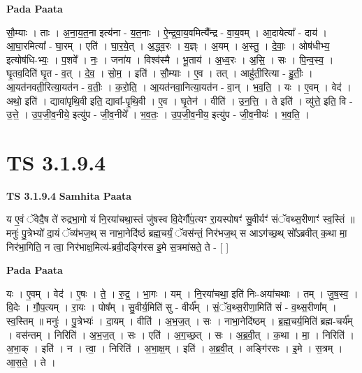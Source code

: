 \documentclass[17pt]{extarticle}
\begin{document}
\textbf{Pada Paata} \newline

सौ॒म्याः । ताः । अ॒ना॒य॒त॒ना इत्य॑ना - य॒त॒नाः । ऐ॒न्द्र॒वा॒य॒वमित्यै᳚न्द्र - वा॒य॒वम् । आ॒दायेत्या᳚ - दाय॑ । आ॒घा॒रमित्या᳚ - घा॒रम् । एति॑ । घा॒र॒ये॒त् । अ॒द्ध्व॒रः । य॒ज्ञ्ः । अ॒यम् । अ॒स्तु॒ । दे॒वाः॒ । ओष॑धीभ्य॒ इत्योष॑धि-भ्यः॒ । प॒शवे᳚ । नः॒ । जना॑य । विश्व॑स्मै । भू॒ताय॑ । अ॒ध्व॒रः । अ॒सि॒ । सः । पि॒न्व॒स्व॒ । घृ॒तव॒दिति॑ घृ॒त - व॒त् । दे॒व॒ । सो॒म॒ । इति॑ । सौ॒म्याः । ए॒व । तत् । आहु॑ती॒रित्या - हु॒तीः॒ । आ॒यत॑नवती॒रित्या॒यत॑न - व॒तीः॒ । क॒रो॒ति॒ । आ॒यत॑नवा॒नित्या॒यत॑न - वा॒न् । भ॒व॒ति॒ । यः । ए॒वम् । वेद॑ । अथो॒ इति॑ । द्यावा॑पृथि॒वी इति॒ द्यावा᳚-पृ॒थि॒वी । ए॒व । घृ॒तेन॑ । वीति॑ । उ॒न॒त्ति॒ । ते इति॑ । व्यु॑त्ते॒ इति॒ वि - उ॒त्ते॒ । उ॒प॒जी॒व॒नीये॒ इत्यु॑प - जी॒व॒नीये᳚ । भ॒व॒तः॒ । उ॒प॒जी॒व॒नीय॒ इत्यु॑प - जी॒व॒नीयः॑ । भ॒व॒ति॒ ।  \newline




\section*{ TS 3.1.9.4 }

\textbf{TS 3.1.9.4 } \newline
\textbf{Samhita Paata} \newline

य ए॒वं ॅवेदै॒ष ते॑ रुद्रभा॒गो यं नि॒रया॑चथा॒स्तं जु॑षस्व वि॒देर्गौ॑प॒त्यꣳ रा॒यस्पोषꣳ॑ सु॒वीर्यꣳ॑ संॅवथ्स॒रीणाꣳ॑ स्व॒स्तिं ॥ मनुः॑ पु॒त्रेभ्यो॑ दा॒यं ॅव्य॑भज॒थ् स नाभा॒नेदि॑ष्ठं ब्रह्म॒चर्यं॒ ॅवस॑न्तं॒ निर॑भज॒थ् स आऽग॑च्छ॒थ् सो᳚ऽब्रवीत् क॒था मा॒ निर॑भा॒गिति॒ न त्वा॒ निर॑भाक्ष॒मित्य॑-ब्रवी॒दङ्गि॑रस इ॒मे स॒त्रमा॑सते॒ ते - [  ] \newline

\textbf{Pada Paata} \newline

यः । ए॒वम् । वेद॑ । ए॒षः । ते॒ । रु॒द्र॒ । भा॒गः । यम् । नि॒रया॑चथा॒ इति॑ निः-अया॑चथाः । तम् । जु॒ष॒स्व॒ । वि॒देः । गौ॒प॒त्यम् । रा॒यः । पोष᳚म् । सु॒वीर्य॒मिति॑ सु - वीर्य᳚म् । सं॒ॅव॒थ्स॒रीणा॒मिति॑ सं - व॒थ्स॒रीणा᳚म् । स्व॒स्तिम् ॥ मनुः॑ । पु॒त्रेभ्यः॑ । दा॒यम् । वीति॑ । अ॒भ॒ज॒त् । सः । नाभा॒नेदि॑ष्ठम् । ब्र॒ह्म॒चर्य॒मिति॑ ब्रह्म-चर्य᳚म् । वस॑न्तम् । निरिति॑ । अ॒भ॒ज॒त् । सः । एति॑ । अ॒ग॒च्छ॒त् । सः । अ॒ब्र॒वी॒त् । क॒था । मा॒ । निरिति॑ । अ॒भा॒क् । इति॑ । न । त्वा॒ । निरिति॑ । अ॒भा॒क्ष॒म् । इति॑ । अ॒ब्र॒वी॒त् । अङ्गि॑रसः । इ॒मे । स॒त्रम् । आ॒स॒ते॒ । ते ।  \newline
\end{document}
